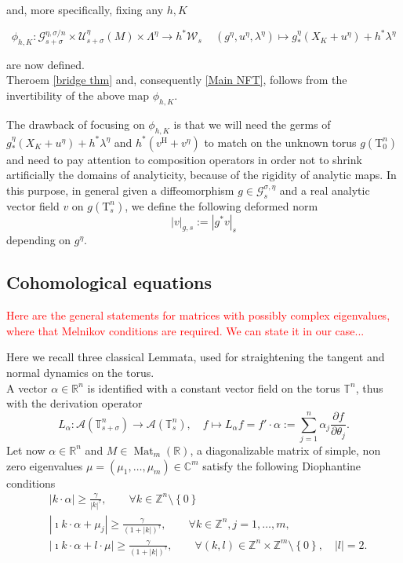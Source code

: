 \documentclass[oneside, 11pt]{amsbook}
\newcommand{\set}[1]{{\left\{#1\right\}}}
\newcommand{\pa}[1]{{\left(#1\right)}}
\newcommand{\abs}[1]{{\left|#1\right|}}
\newcommand{\normal}{\mathrm}
\newcommand{\T}{\mathbb{T}}
\newcommand{\Z}{\mathbb{Z}}
\newcommand{\R}{\mathbb{R}}
\newcommand{\C}{\mathbb{C}}
\newcommand{\teta}{\theta}
\newcommand{\Mat}{\operatorname{Mat}}
\newcommand{\vh}{v^{\text{H}}} %
\newcommand{\cG}{{\mathcal G}}
\newcommand{\cU}{{\mathcal U}}
\newcommand{\cW}{{\mathcal W}}
\newcommand{\0}{{(0)}}
\newcommand{\3}{{(3)}}
\newcommand{\red}[1]{\textcolor{red}{#1}}
\numberwithin{equation}{section}
\numberwithin{defn}{section}
\numberwithin{prop}{section}
\numberwithin{cor}{section}
\numberwithin{lemma}{section}
\numberwithin{rmk}{section}
\numberwithin{corollary}{section}
\begin{document}
and, more specifically, fixing any $h,K$

\begin{equation}
\label{phi intermedio} 
\phi_{h,K}:   \cG_{s+\sigma}^{\eta,\sigma/n}\times\cU_{s+\sigma}^\eta(M)  \times \Lambda^\eta \to h^{*}\cW_s\, \quad  ( g^\eta, u^\eta, \lambda^\eta)\mapsto  g^\eta_*(X_K + u^\eta) + h^*\lambda^\eta
\end{equation}

are now defined. 
\\

Theroem \ref{bridge thm} and, consequently \ref{Main NFT}, follows from the invertibility of the above map $\phi_{h,K}$.

\smallskip

The drawback of focusing on $\phi_{h,K}$ is that we will need the germs of $ g^\eta_*(X_K + u^\eta) + h^*\lambda^\eta $ and $h^*(\vh + v^\eta)$ to match on the unknown torus $g(\normal{T}^n_0)$ and need to pay attention to composition operators in order not to shrink artificially the domains of analyticity, because of the rigidity of analytic maps. In this purpose, in general given a diffeomorphism $g\in\mathcal{G}^{\sigma,\eta}_{s}$ and a real analytic vector field $v$ on $g(\normal{T}^n_s)$, we define the following deformed norm \[\abs{v}_{g,s} := \abs{{g}^* v}_s\]  depending on $g^\eta$.




\subsection{Cohomological equations}
\red{Here are the general statements for matrices with possibly complex eigenvalues, where that Melnikov conditions are required. We can state it in our case...}

Here we recall three classical Lemmata, used for straightening the tangent and normal dynamics on the torus. \\ 
A vector $\alpha \in\R^n$ is identified with a constant vector field on the torus $\T^n$, thus with the derivation operator
\begin{equation*}
L_{\alpha} : \mathcal{A}(\T^n_{s+\sigma}) \to \mathcal {A}(\T^n_s),\quad f \mapsto L_\alpha f = f'\cdot \alpha := \sum_{j=1}^n \alpha_j \frac{\partial f}{\partial\teta_j}.
\end{equation*}
Let now $\alpha\in\R^n$ and $M\in\Mat_m(\R)$, a diagonalizable matrix of simple, non zero eigenvalues $\mu = (\mu_1,\ldots,\mu_m)\in\C^m$ satisfy the following Diophantine conditions
\begin{align}
\label{Dio 1}
&\abs{k\cdot\alpha}\geq \frac{\gamma}{\abs{k}^\tau},\qquad \forall k\in\Z^n\setminus\set{0}\\
\label{Dio 2}
&\abs{\imath k\cdot\alpha + \mu_j}\geq \frac{\gamma}{\pa{1 + \abs{k}}^\tau},\qquad \forall k\in\Z^n, j=1,\dots,m,\\
\label{Dio 3}
&\abs{\imath k\cdot\alpha + l\cdot \mu}\geq \frac{\gamma}{\pa{1 + \abs{k}}^\tau},\qquad \forall (k,l)\in\Z^n\times\Z^m\setminus\set{0},\quad\abs{l}=2.
\end{align}
\end{document}
